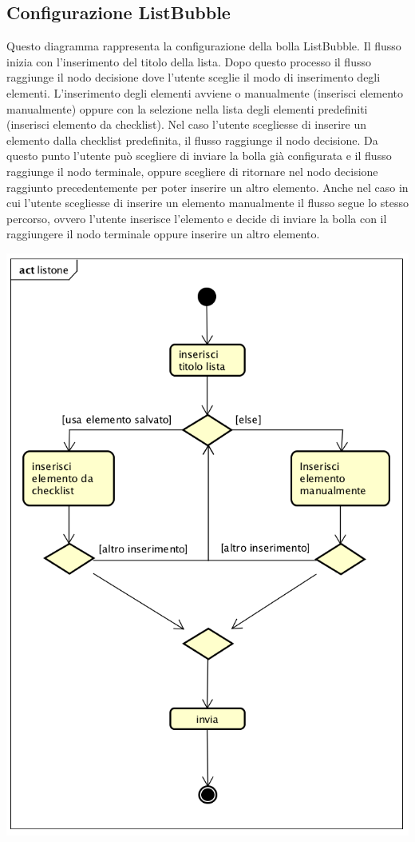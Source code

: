 \subsection{Configurazione ListBubble}
Questo diagramma rappresenta la configurazione della bolla
ListBubble. Il flusso inizia con l’inserimento del titolo della
lista. Dopo questo processo il flusso raggiunge il nodo decisione dove
l’utente sceglie il modo di inserimento degli elementi. L’inserimento
degli elementi avviene o manualmente (inserisci elemento manualmente)
oppure con la selezione nella lista degli elementi predefiniti
(inserisci elemento da checklist). Nel caso l’utente scegliesse di
inserire un elemento dalla checklist predefinita, il flusso raggiunge
il nodo decisione. Da questo punto l’utente può scegliere di inviare
la bolla già configurata e il flusso raggiunge il nodo terminale,
oppure scegliere di ritornare nel nodo decisione raggiunto
precedentemente per poter inserire un altro elemento. Anche nel caso
in cui l’utente scegliesse di inserire un elemento manualmente il
flusso segue lo stesso percorso, ovvero l’utente inserisce l’elemento
e decide di inviare la bolla con il raggiungere il nodo terminale
oppure inserire un altro elemento. 

\begin{center}
  \includegraphics[scale=0.5]{img/ListBubble.png}
\end{center}



